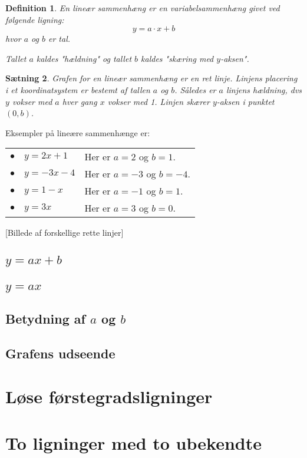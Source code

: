 \documentclass[12pt,oneside,a4paper]{article}
\newtheorem{thm}{Sætning}[section]
\newtheorem{mydef}[thm]{Definition}
\begin{document}
\begin{mydef}
    En lineær sammenhæng er en variabelsammenhæng givet ved følgende ligning:
    $$
    y = a\cdot x + b
    $$
    hvor $a$ og $b$ er tal.
    
    Tallet $a$ kaldes "hældning" og tallet $b$ kaldes "skæring med $y$-aksen".
\end{mydef}

\begin{thm}
    Grafen for en lineær sammenhæng er en ret linje.
    Linjens placering i et koordinatsystem er bestemt af tallen $a$ og $b$.
    Således er $a$ linjens hældning, dvs $y$ vokser med $a$ hver gang $x$ vokser med 1.
    Linjen skærer $y$-aksen i punktet $(0, b)$.
\end{thm}

Eksempler på lineære sammenhænge er:

\begin{tabular}{ll}
    $\bullet\quad y=2x+1$  & Her er $a=2$ og $b=1$. \\
    $\bullet\quad y=-3x-4$ & Her er $a=-3$ og $b=-4$. \\
    $\bullet\quad y=1-x$   & Her er $a=-1$ og $b=1$. \\
    $\bullet\quad y=3x$    & Her er $a=3$ og $b=0$.
\end{tabular}


[Billede af forskellige rette linjer]

\subsection{$y=ax+b$}
\subsection{$y=ax$}
\subsection{Betydning af $a$ og $b$}
\subsection{Grafens udseende}
\section{Løse førstegradsligninger}
\section{To ligninger med to ubekendte}
\end{document}
